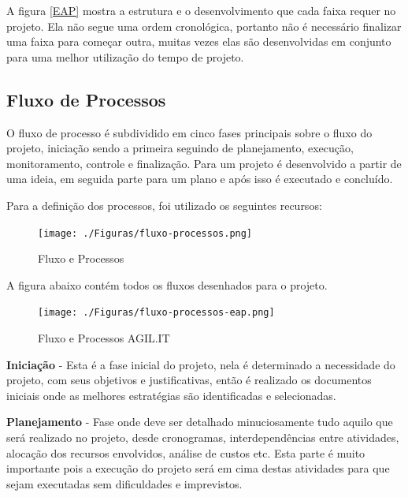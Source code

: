 A figura \ref{EAP} mostra a estrutura e o desenvolvimento que cada faixa requer no projeto. Ela não segue uma ordem cronológica, portanto não é necessário finalizar uma faixa para começar outra, muitas vezes elas são desenvolvidas em conjunto para uma melhor utilização do tempo de projeto.


\subsection{Fluxo de Processos}

{O fluxo de processo é subdividido em cinco fases principais sobre o fluxo do projeto, iniciação sendo a primeira seguindo de planejamento, execução, monitoramento, controle e finalização. Para \cite{PMG2018} um projeto é desenvolvido a partir de uma ideia, em seguida parte para um plano e após isso é executado e concluído.}

Para a definição dos processos, foi utilizado os seguintes recursos:

\begin{figure}[H]
	\caption{\label{Fluxo-Processos}Fluxo e Processos}
	\begin{center}
		\texttt{[image: ./Figuras/fluxo-processos.png]}
	\end{center}
\end{figure}



A figura abaixo contém todos os fluxos desenhados para o projeto.

\begin{figure}[H]
	\caption{\label{Fluxo-Processos-eap}Fluxo e Processos AGIL.IT}
	\begin{center}
		\texttt{[image: ./Figuras/fluxo-processos-eap.png]}
	\end{center}
\end{figure}



{\textbf{Iniciação} - Esta é a fase inicial do projeto, nela é determinado a necessidade do projeto, com seus objetivos e justificativas, então é realizado os documentos iniciais onde as melhores estratégias são identificadas e selecionadas.}

{\textbf{Planejamento} - Fase onde deve ser detalhado minuciosamente tudo aquilo que será realizado no projeto, desde cronogramas, interdependências entre atividades, alocação dos recursos envolvidos, análise de custos etc. Esta parte é muito importante pois a execução do projeto será em cima destas atividades para que sejam executadas sem dificuldades e imprevistos.}

